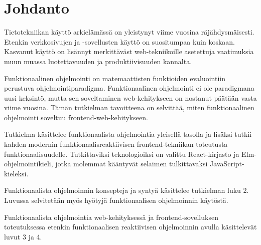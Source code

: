 \chapter{Johdanto} \label{Johdanto}
Tietotekniikan käyttö arkielämässä on yleistynyt viime vuosina räjähdysmäisesti. Etenkin verkkosivujen ja -sovellusten
käyttö on suositumpaa kuin koskaan. Kasvanut käyttö on lisännyt merkittäväst web-tekniikoille asetettuja vaatimuksia
muun muassa luotettavuuden ja produktiivisuuden kannalta. 

Funktionaalinen ohjelmointi on matemaattisten funktioiden evaluointiin perustuva ohjelmointiparadigma. Funktionaalinen
ohjelmointi ei ole paradigmana uusi keksintö, mutta sen soveltaminen web-kehitykseen on nostanut päätään vasta viime
vuosina. Tämän tutkielman tavoitteena on selvittää, miten funktionaalinen ohjelmointi soveltuu frontend-web-kehitykseen.

Tutkielma käsittelee funktionaalista ohjelmointia yleisellä tasolla ja lisäksi tutkii kahden modernin
funktionaalisreaktiivisen frontend-tekniikan toteutusta funktionaalisuudelle. Tutkittaviksi teknologioiksi on valittu
React-kirjasto ja Elm-ohjelmointikieli, jotka molemmat kääntyvät selaimen tulkittavaksi JavaScript-kieleksi.

Funktionaalista ohjelmoinnin konsepteja ja syntyä käsittelee tutkielman luku 2. Luvussa selvitetään myös hyötyjä
funktionaalisen ohjelmoinnin käytöstä.

Funktionaalista ohjelmointia web-kehityksessä ja frontend-sovelluksen toteutuksessa etenkin funktionaalisen reaktiivisen
ohjelmoinnin avulla käsittelevät luvut 3 ja 4.

